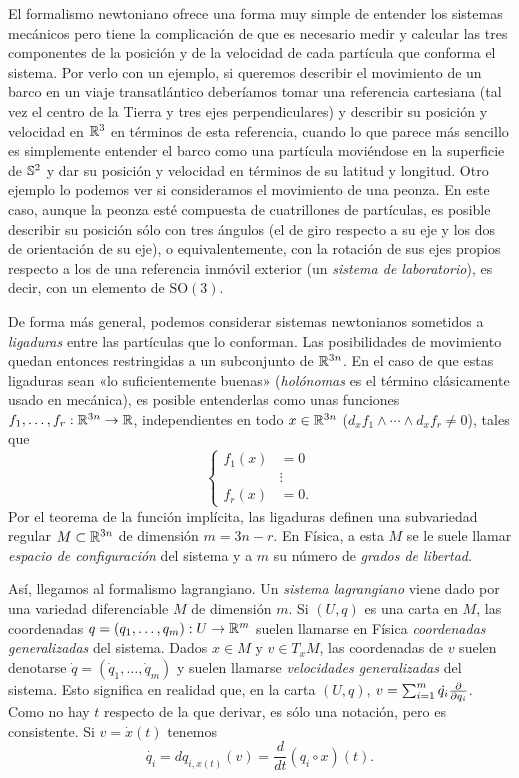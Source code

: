 El formalismo newtoniano ofrece una forma muy simple de entender los sistemas mecánicos pero tiene la complicación de que es necesario medir y calcular las tres componentes de la posición y de la velocidad de cada partícula que conforma el sistema. Por verlo con un ejemplo, si queremos describir el movimiento de un barco en un viaje transatlántico deberíamos tomar una referencia cartesiana (tal vez el centro de la Tierra y tres ejes perpendiculares) y describir su posición y velocidad en $\mathbb{R}^3$ en términos de esta referencia, cuando lo que parece más sencillo es simplemente entender el barco como una partícula moviéndose en la superficie de $\mathbb{S}^2$ y dar su posición y velocidad en términos de su latitud y longitud.
Otro ejemplo lo podemos ver si consideramos el movimiento de una peonza. En este caso, aunque la peonza esté compuesta de cuatrillones de partículas, es posible describir su posición sólo con tres ángulos (el de giro respecto a su eje y los dos de orientación de su eje), o equivalentemente, con la rotación de sus ejes propios respecto a los de una referencia inmóvil exterior (un \emph{sistema de laboratorio}), es decir, con un elemento de $\mathrm{SO}(3)$. 

De forma más general, podemos considerar sistemas newtonianos sometidos a \emph{ligaduras} entre las partículas que lo conforman. Las posibilidades de movimiento quedan entonces restringidas a un subconjunto de $\mathbb{R}^{3n}$. En el caso de que estas ligaduras sean «lo suficientemente buenas» (\emph{holónomas} es el término clásicamente usado en mecánica), es posible entenderlas como unas funciones $f_1,\dots,f_r: \mathbb{R}^{3n} \rightarrow \mathbb{R}$, independientes en todo $x \in \mathbb{R}^{3n}$ ($d_xf_1 \wedge \cdots \wedge d_xf_r \neq 0$), tales que
\begin{equation*}
  \left\lbrace
  \begin{array}{rl}
    f_1(x)&=0 \\
    &\vdots \\
    f_r(x)&=0.
  \end{array}
  \right.
\end{equation*}
Por el teorema de la función implícita, las ligaduras definen una subvariedad regular $M \subset \mathbb{R}^{3n}$ de dimensión $m=3n-r$. En Física, a esta $M$ se le suele llamar \emph{espacio de configuración} del sistema y a $m$ su número de \emph{grados de libertad}.

Así, llegamos al formalismo lagrangiano. Un \emph{sistema lagrangiano} viene dado por una variedad diferenciable $M$ de dimensión $m$. Si $(U,q)$ es una carta en $M$, las coordenadas $q=(q_1,\dots,q_m): U \rightarrow \mathbb{R}^m$ suelen llamarse en Física \emph{coordenadas generalizadas} del sistema. Dados $x \in M$ y $v \in T_x M$, las coordenadas de $v$ suelen denotarse $\dot{q}=(\dot{q}_1,\dots,\dot{q}_m)$ y suelen llamarse \emph{velocidades generalizadas} del sistema. Esto significa en realidad que, en la carta $(U,q)$, $v=\sum_{i=1}^{m}\dot{q_i}\frac{\partial}{\partial q_i}$. Como no hay $t$ respecto de la que derivar, es sólo una notación, pero es consistente. Si $v=\dot{x}(t)$ tenemos
\begin{equation*}
  \dot{q_i} = dq_{i,x(t)}(v)=\frac{d}{dt}(q_i \circ x) (t).
\end{equation*}

